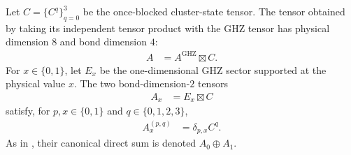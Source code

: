 \begin{definition}
    \label{def:mpug_ghz_blocked_cluster_tensor}
    \leanok
    Let $C=\{C^q\}_{q=0}^3$ be the once-blocked cluster-state tensor. The tensor
    obtained by taking its independent tensor product with the GHZ tensor has
    physical dimension $8$ and bond dimension $4$:
    \begin{align}
        A & =A^{\mathrm{GHZ}}\boxtimes C.
        \label{eq:mpug_ghz_blocked_cluster_tensor}
    \end{align}
    For $x\in\{0,1\}$, let $E_x$ be the one-dimensional GHZ sector supported
    at the physical value $x$. The two bond-dimension-$2$ tensors
    \begin{align}
        A_x & =E_x\boxtimes C
    \end{align}
    satisfy, for $p,x\in\{0,1\}$ and $q\in\{0,1,2,3\}$,
    \begin{align}
        A_x^{(p,q)} & =\delta_{p,x}C^q.
        \label{eq:mpug_ghz_blocked_cluster_blocks}
    \end{align}
    As in \cite[lines~4427--4479]{FrancoRubio2025MPUGauging}, their canonical
    direct sum is denoted $A_0\oplus A_1$.
\end{definition}

